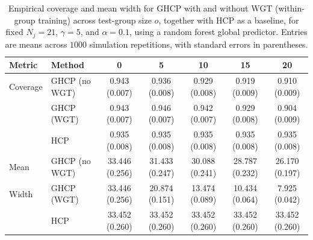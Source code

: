 \begin{table}[t]
\centering
\caption{Empirical coverage and mean width for GHCP with and without WGT (within-group training) across test-group size $o$, together with HCP as a baseline, for fixed $N_j=21$, $\gamma=5$, and $\alpha=0.1$, using a random forest global predictor. Entries are means across $1000$ simulation repetitions, with standard errors in parentheses.}
\label{tab:sim-with-vs-without-training}
\small
\setlength{\tabcolsep}{5pt}
\begin{tabular}{llccccc}
\toprule
Metric & Method & 0 & 5 & 10 & 15 & 20 \\
\midrule
Coverage
& GHCP (no WGT) & 0.943 (0.007) & 0.936 (0.008) & 0.929 (0.008) & 0.919 (0.009) & 0.910 (0.009) \\
& GHCP (WGT)    & 0.943 (0.007) & 0.946 (0.007) & 0.942 (0.007) & 0.929 (0.008) & 0.904 (0.009) \\
& HCP            & 0.935 (0.008) & 0.935 (0.008) & 0.935 (0.008) & 0.935 (0.008) & 0.935 (0.008) \\
\addlinespace
Mean
& GHCP (no WGT) & 33.446 (0.256) & 31.433 (0.247) & 30.088 (0.241) & 28.787 (0.232) & 26.170 (0.197) \\
Width & GHCP (WGT)  & 33.446 (0.256) & 20.874 (0.151) & 13.474 (0.089) & 10.434 (0.064) & 7.925 (0.042) \\
& HCP            & 33.452 (0.260) & 33.452 (0.260) & 33.452 (0.260) & 33.452 (0.260) & 33.452 (0.260) \\
\bottomrule
\end{tabular}
\end{table}
